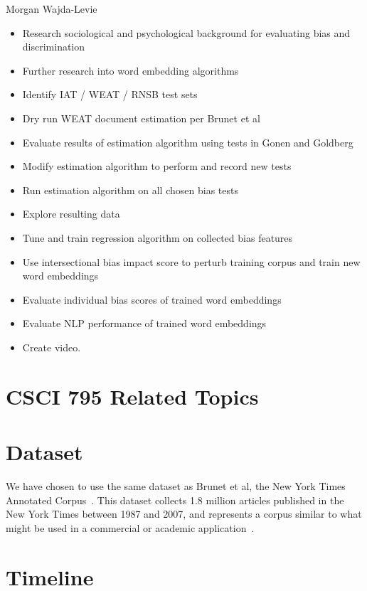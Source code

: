 \documentclass{article}
\begin{document}
\vspace{1em}
\noindent
Morgan Wajda-Levie
\begin{itemize}
    \item Research sociological and psychological background for
        evaluating bias and discrimination
    \item Further research into word embedding algorithms
    \item Identify IAT / WEAT / RNSB test sets
    \item Dry run WEAT document estimation per Brunet et
        al~\cite{brunet_understanding_2019}
    \item Evaluate results of estimation algorithm using tests
        in Gonen and Goldberg~\cite{gonen_lipstick_2019}
    \item Modify estimation algorithm to perform and record new tests
    \item Run estimation algorithm on all chosen bias tests
    \item Explore resulting data
    \item Tune and train regression algorithm on collected bias features
    \item Use intersectional bias impact score to perturb training
        corpus and train new word embeddings
    \item Evaluate individual bias scores of trained word embeddings
    \item Evaluate NLP performance of trained word embeddings
    \item Create video.
\end{itemize}

\section{CSCI 795 Related Topics}

\section{Dataset}

We have chosen to use the same dataset as Brunet et al, the New York
Times Annotated Corpus~\cite{sandhaus_evan_new_2008}. This dataset
collects 1.8 million articles published in the New York Times between
1987 and 2007, and represents a corpus similar to what might be used in
a commercial or academic application~\cite{brunet_understanding_2019}.

\section{Timeline}
\end{document}
